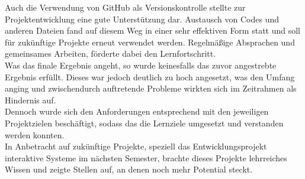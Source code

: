Auch die Verwendung von GitHub als Versionskontrolle stellte zur Projektentwicklung eine gute Unterstützung dar. Austausch von Codes und anderen Dateien fand auf diesem Weg in einer sehr effektiven Form statt und soll für zukünftige Projekte erneut verwendet werden. Regelmäßige Absprachen und gemeinsames Arbeiten, förderte dabei den Lernfortschritt.\\
Was das finale Ergebnis angeht, so wurde keinesfalls das zuvor angestrebte Ergebnis erfüllt. Dieses war jedoch deutlich zu hoch angesetzt, was den Umfang anging und zwischendurch auftretende Probleme wirkten sich im Zeitrahmen als Hindernis auf.\\
Dennoch wurde sich den Anforderungen entsprechend mit den jeweiligen Projektzielen beschäftigt, sodass das die Lernziele umgesetzt und verstanden werden konnten.\\

In Anbetracht auf zukünftige Projekte, speziell das Entwicklungsprojekt interaktive Systeme im nächsten Semester, brachte dieses Projekte lehrreiches Wissen und zeigte Stellen auf, an denen noch mehr Potential steckt.
